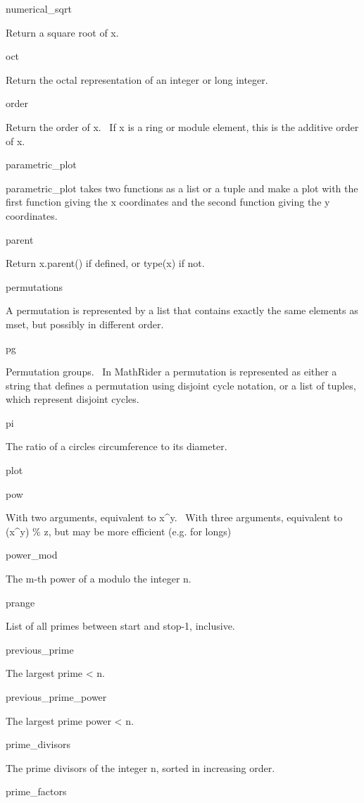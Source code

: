 \documentclass[12pt,twoside]{book}
\begin{document}
numerical\_sqrt

Return a square root of x.

oct

Return the octal representation of an integer or long integer.

order

Return the order of x. \ If x is a ring or module element, this is the additive order of x.

parametric\_plot

parametric\_plot takes two functions as a list or a tuple and make a plot with the first function giving the x coordinates and the second function giving the y coordinates.

parent

Return x.parent() if defined, or type(x) if not.

permutations

A permutation is represented by a list that contains exactly the same elements as mset, but possibly in different order.

pg

Permutation groups. \ In MathRider a permutation is represented as either a string that defines a permutation using disjoint cycle notation, or a list of tuples, which represent disjoint cycles.

pi

The ratio of a circle{\textquotesingle}s circumference to its diameter.

plot


\bigskip

pow

With two arguments, equivalent to x\^{}y. \ With three arguments, equivalent to (x\^{}y) \% z, but may be more efficient (e.g. for longs)

power\_mod

The m{}-th power of a modulo the integer n.

prange

List of all primes between start and stop{}-1, inclusive.

previous\_prime

The largest prime {\textless} n.

previous\_prime\_power

The largest prime power {\textless} n.

prime\_divisors

The prime divisors of the integer n, sorted in increasing order.

prime\_factors
\end{document}
